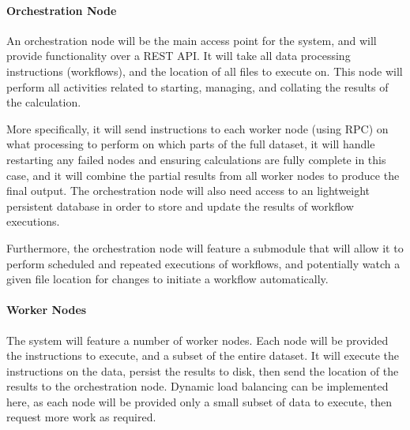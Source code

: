 \documentclass[12pt]{article}
\begin{document}
	\begin{center}
	\end{center}
	
	\paragraph{Orchestration Node}
	An orchestration node will be the main access point for the system, and will provide functionality over a REST API. It will take all data processing instructions (workflows), and the location of all files to execute on. This node will perform all activities related to starting, managing, and collating the results of the calculation.
	
	More specifically, it will send instructions to each worker node (using RPC) on what processing to perform on which parts of the full dataset, it will handle restarting any failed nodes and ensuring calculations are fully complete in this case, and it will combine the partial results from all worker nodes to produce the final output. The orchestration node will also need access to an lightweight persistent database in order to store and update the results of workflow executions.
	
	Furthermore, the orchestration node will feature a submodule that will allow it to perform scheduled and repeated executions of workflows, and potentially watch a given file location for changes to initiate a workflow automatically.
	
	\paragraph{Worker Nodes}
	The system will feature a number of worker nodes. Each node will be provided the instructions to execute, and a subset of the entire dataset. It will execute the instructions on the data, persist the results to disk, then send the location of the results to the orchestration node. Dynamic load balancing can be implemented here, as each node will be provided only a small subset of data to execute, then request more work as required.
	
\end{document}
